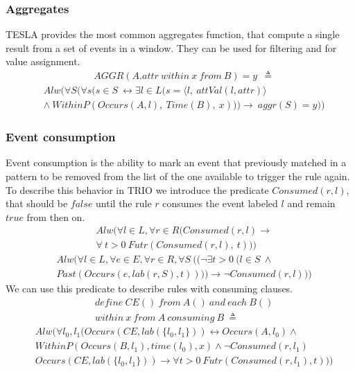 \subsubsection{Aggregates}
TESLA provides the most common aggregates function, that compute a single result from a set of events in a window. They can be used for filtering and for value assignment.
\begin{align*}
&AGGR(A.attr\ within\ x\ from\ B) = y\ \ \triangleq
\end{align*}
\begin{align*}
&Alw(\forall S (\forall s (s \in S\ \leftrightarrow \exists l \in
L (s = \langle l,\ attVal(l,attr) \rangle\\
&\wedge\ WithinP(Occurs(A,l),\ Time(B),\ x))) \rightarrow\ aggr(S)=y))
\end{align*}

\subsubsection{Event consumption}
Event consumption is the ability to mark an event that previously matched in a pattern to be removed from the list of the one available to trigger the rule again. To describe this behavior in TRIO we introduce the predicate $Consumed(r, l)$, that should be $false$ until the rule $r$ consumes the event labeled $l$ and remain $true$ from then on.
\begin{align*}
&Alw(\forall l \in L, \forall r \in R (Consumed(r, l) \rightarrow\\
&\forall\ t > 0\ Futr(Consumed(r, l),\ t)))
\end{align*}
\begin{align*}
&Alw(\forall l \in L, \forall e \in E, \forall r \in R, \forall S\ ((\neg \exists t > 0\ (l \in S\ \wedge\\
&Past(Occurs(e, lab(r, S),t)))) \rightarrow \neg Consumed(r, l)))
\end{align*}
We can use this predicate to describe rules with consuming clauses.
\begin{align*}
&define\ CE()\ from\ A()\ and\ each\ B()\\
&within\ x\ from\ A\ consuming\ B\ \triangleq
\end{align*}
\begin{align*}
&Alw(\forall l_0, l_1 (Occurs(CE, lab(\{l_0, l_1\})) \leftrightarrow Occurs(A, l_0) \wedge\\
&WithinP(Occurs(B, l_1), time(l_0), x) \wedge \neg Consumed(r, l_1)\\
&Occurs(CE, lab(\{l_0, l_1\})) \rightarrow \forall t > 0\ Futr(Consumed(r, l_1), t)))
\end{align*}

